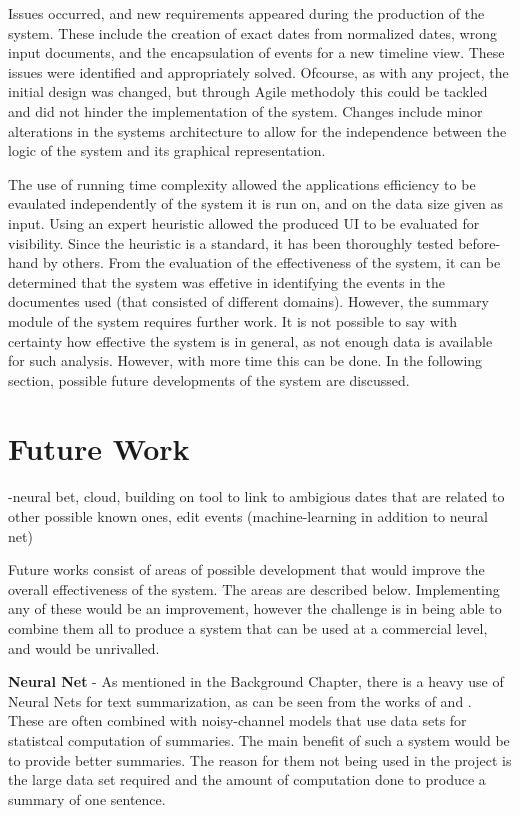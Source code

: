 \par Issues occurred, and new requirements appeared during the production of the system. These include the creation of exact dates from normalized dates, wrong input documents, and the encapsulation of events for a new timeline view. These issues were identified and appropriately solved. Ofcourse, as with any project, the initial design was changed, but through Agile methodoly this could be tackled and did not hinder the implementation of the system. Changes include minor alterations in the systems architecture to allow for the independence between the logic of the system and its graphical representation.

\par The use of running time complexity allowed the applications efficiency to be evaulated independently of the system it is run on, and on the data size given as input. Using an expert heuristic allowed the produced UI to be evaluated for visibility. Since the heuristic is a standard, it has been thoroughly tested before-hand by others. From the evaluation of the effectiveness of the system, it can be determined that the system was effetive in identifying the events in the documentes used (that consisted of different domains). However, the summary module of the system requires further work. It is not possible to say with certainty how effective the system is in general, as not enough data is available for such analysis. However, with more time this can be done. In the following section, possible future developments of the system are discussed.

\section{Future Work}
-neural bet, cloud, building on tool to link to ambigious dates that are related to other possible known ones, edit events (machine-learning in addition to neural net)

\par Future works consist of areas of possible development that would improve the overall effectiveness of the system. The areas are described below. Implementing any of these would be an improvement, however the challenge is in being able to combine them all to produce a system that can be used at a commercial level, and would be unrivalled.

\par \textbf{Neural Net} - As mentioned in the Background Chapter, there is a heavy use of Neural Nets for text summarization, as can be seen from the works of \cite{chopraaulirush2016} and \cite{rushchopraweston2015}. These are often combined with noisy-channel models that use data sets for statistcal computation of summaries. The main benefit of such a system would be to provide better summaries. The reason for them not being used in the project is the large data set required and the amount of computation done to produce a summary of one sentence.

